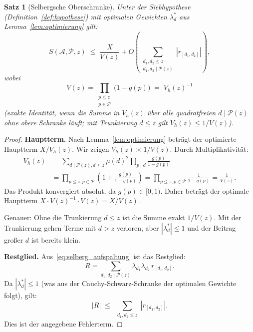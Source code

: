 \documentclass[12pt,a4paper]{amsart}
\newtheorem{theorem}{Satz}[section]
\theoremstyle{definition}
\begin{document}
\begin{theorem}[Selbergsche Oberschranke]\label{thm:selberg_haupt}
  Unter der Siebhypothese (Definition~\ref{def:hypothese}) mit optimalen Gewichten
  $\lambda_d^*$ aus Lemma~\ref{lem:optimierung} gilt:
  \[
    S(\mathcal{A}, \mathcal{P}, z)
    \;\leq\; \frac{X}{V(z)}
             + O\!\left(\sum_{\substack{d_1, d_2 \leq z \\ d_1,d_2 \mid \mathcal{P}(z)}} |r_{[d_1,d_2]}|\right),
  \]
  wobei
  \[
    V(z) = \prod_{\substack{p \leq z \\ p \in \mathcal{P}}} \bigl(1 - g(p)\bigr)
    \;=\; V_h(z)^{-1}
  \]
  (exakte Identität, wenn die Summe in $V_h(z)$ über alle quadratfreien
  $d \mid \mathcal{P}(z)$ ohne obere Schranke läuft; mit Trunkierung $d \leq z$
  gilt $V_h(z) \leq 1/V(z)$).
\end{theorem}

\begin{proof}
  \textbf{Hauptterm.}
  Nach Lemma~\ref{lem:optimierung} beträgt der optimierte Hauptterm $X/V_h(z)$.
  Wir zeigen $V_h(z) \asymp 1/V(z)$.  Durch Multiplikativität:
  \begin{align*}
    V_h(z)
    &= \sum_{d \mid \mathcal{P}(z), d \leq z} \mu(d)^2 \prod_{p \mid d} \frac{g(p)}{1-g(p)} \\
    &= \prod_{p \leq z, p \in \mathcal{P}} \left(1 + \frac{g(p)}{1-g(p)}\right)
    = \prod_{p \leq z, p \in \mathcal{P}} \frac{1}{1 - g(p)}
    = \frac{1}{V(z)}.
  \end{align*}
  Das Produkt konvergiert absolut, da $g(p) \in [0,1)$.
  Daher beträgt der optimale Hauptterm $X \cdot V(z)^{-1} \cdot V(z) = X/V(z)$.

  Genauer: Ohne die Trunkierung $d \leq z$ ist die Summe exakt $1/V(z)$.
  Mit der Trunkierung gehen Terme mit $d > z$ verloren, aber $|\lambda_d^*| \leq 1$
  und der Beitrag großer $d$ ist bereits klein.

  \textbf{Restglied.}
  Aus~\eqref{eq:selberg_aufspaltung} ist das Restglied:
  \[
    R = \sum_{d_1, d_2 \mid \mathcal{P}(z)} \lambda_{d_1}\lambda_{d_2}\, r_{[d_1,d_2]}.
  \]
  Da $|\lambda_d^*| \leq 1$ (was aus der Cauchy-Schwarz-Schranke der optimalen
  Gewichte folgt), gilt:
  \[
    |R| \;\leq\; \sum_{\substack{d_1, d_2 \leq z}} |r_{[d_1,d_2]}|.
  \]
  Dies ist der angegebene Fehlerterm.
\end{proof}
\end{document}
